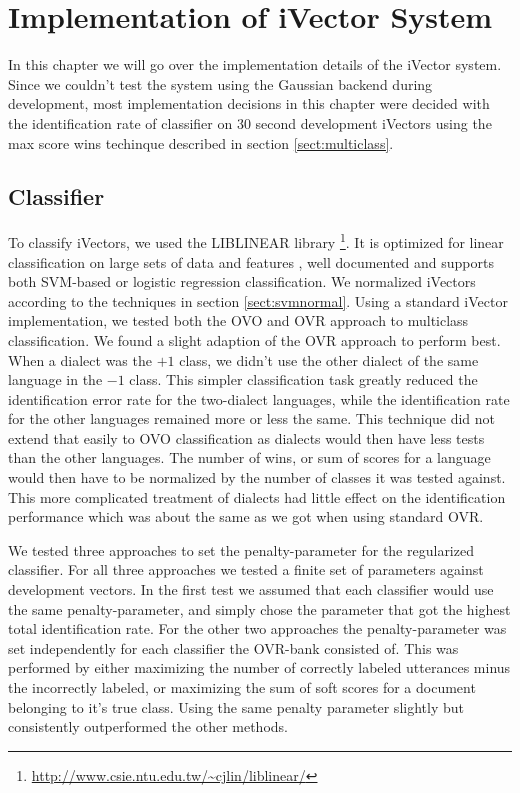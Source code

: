 \chapter{Implementation of iVector System}

In this chapter we will go over the implementation details of the iVector system. Since we couldn't test the system using the Gaussian backend during development, most implementation decisions in this chapter were decided with the identification rate of classifier on 30 second development iVectors using the max score wins techinque described in section \ref{sect:multiclass}.

\section{Classifier}

To classify iVectors, we used the LIBLINEAR library \footnote{\url{http://www.csie.ntu.edu.tw/~cjlin/liblinear/}}. It is optimized for linear classification on large sets of data and features \cite{liblinear}, well documented and supports both SVM-based or logistic regression classification. We normalized iVectors according to the techniques in section \ref{sect:svmnormal}. Using a standard iVector implementation, we tested both the OVO and OVR approach to multiclass classification. We found a slight adaption of the OVR approach to perform best. When a dialect was the $+1$ class, we didn't use the other dialect of the same language in the $-1$ class. This simpler classification task greatly reduced the identification error rate for the two-dialect languages, while the identification rate for the other languages remained more or less the same. This technique did not extend that easily to OVO classification as dialects would then have less tests than the other languages. The number of wins, or sum of scores for a language would then have to be normalized by the number of classes it was tested against. This more complicated treatment of dialects had little effect on the identification performance which was about the same as we got when using standard OVR. 

We tested three approaches to set the penalty-parameter for the regularized classifier. For all three approaches we tested a finite set of parameters against development vectors. In the first test we assumed that each classifier would use the same penalty-parameter, and simply chose the parameter that got the highest total identification rate. For the other two approaches the penalty-parameter was set independently for each classifier the OVR-bank consisted of. This was performed by either maximizing the number of correctly labeled utterances minus the incorrectly labeled, or maximizing the sum of soft scores for a document belonging to it's true class. Using the same penalty parameter slightly but consistently outperformed the other methods. 

